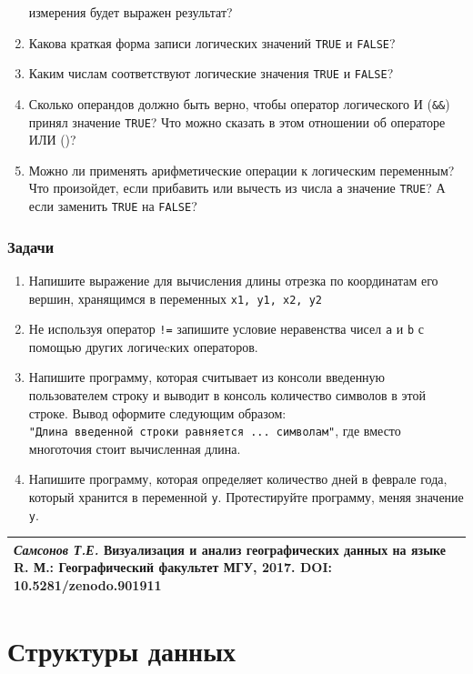 \documentclass[]{book}
\begin{document}
\begin{enumerate}
  измерения будет выражен результат?
\item
  Какова краткая форма записи логических значений \texttt{TRUE} и
  \texttt{FALSE}?
\item
  Каким числам соответствуют логические значения \texttt{TRUE} и
  \texttt{FALSE}?
\item
  Сколько операндов должно быть верно, чтобы оператор логического И
  (\texttt{\&\&}) принял значение \texttt{TRUE}? Что можно сказать в
  этом отношении об операторе ИЛИ (\texttt{\textbar{}\textbar{}})?
\item
  Можно ли применять арифметические операции к логическим переменным?
  Что произойдет, если прибавить или вычесть из числа \texttt{a}
  значение \texttt{TRUE}? А если заменить \texttt{TRUE} на
  \texttt{FALSE}?
\end{enumerate}

\subsection{Задачи}\label{tasks_basics}

\begin{enumerate}
\def\labelenumi{\arabic{enumi}.}
\item
  Напишите выражение для вычисления длины отрезка по координатам его
  вершин, хранящимся в переменных \texttt{x1,\ y1,\ x2,\ y2}
\item
  Не используя оператор \texttt{!=} запишите условие неравенства чисел
  \texttt{a} и \texttt{b} с помощью других логичеcких операторов.
\item
  Напишите программу, которая считывает из консоли введенную
  пользователем строку и выводит в консоль количество символов в этой
  строке. Вывод оформите следующим образом:
  \texttt{"Длина\ введенной\ строки\ равняется\ ...\ символам"}, где
  вместо многоточия стоит вычисленная длина.
\item
  Напишите программу, которая определяет количество дней в феврале года,
  который хранится в переменной \texttt{y}. Протестируйте программу,
  меняя значение \texttt{y}.
\end{enumerate}

\begin{longtable}[]{@{}l@{}}
\toprule
\emph{Самсонов Т.Е.} \textbf{Визуализация и анализ географических данных
на языке R.} М.: Географический факультет МГУ, 2017. DOI:
10.5281/zenodo.901911\tabularnewline
\bottomrule
\end{longtable}

\chapter{Структуры данных}\label{data_structures}
\end{document}
